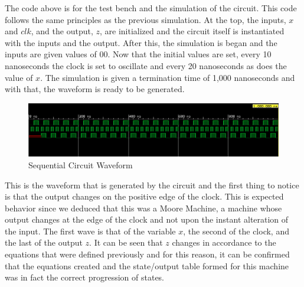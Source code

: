\documentclass[12pt]{article}
\begin{document}
    \par The code above is for the test bench and the simulation of the circuit.
    This code follows the same principles as the previous simulation. At the
    top, the inputs, $x$ and $clk$, and the output, $z$, are initialized and the
    circuit itself is instantiated with the inputs and the output. After this,
    the simulation is began and the inputs are given values of 00. Now that the
    initial values are set, every 10 nanoseconds the clock is set to oscillate
    and every 20 nanoseconds as does the value of $x$. The simulation is given a
    termination time of 1,000 nanoseconds and with that, the waveform is ready
    to be generated.
    \begin{figure}[h]
        \centering
        \includegraphics[width=1.0\textwidth]{Sequential Circuit Waveform.png}
        \caption{Sequential Circuit Waveform}
    \end{figure}
    \par This is the waveform that is generated by the circuit and the first
    thing to notice is that the output changes on the positive edge of the
    clock. This is expected behavior since we deduced that this was a Moore
    Machine, a machine whose output changes at the edge of the clock and not
    upon the instant alteration of the input. The first wave is that of the
    variable $x$, the second of the clock, and the last of the output $z$. It
    can be seen that $z$ changes in accordance to the equations that were
    defined previously and for this reason, it can be confirmed that the
    equations created and the state/output table formed for this machine was in
    fact the correct progression of states.
\end{document}
